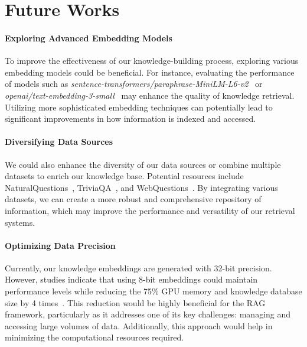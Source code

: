 \section{Future Works}

\paragraph{Exploring Advanced Embedding Models} To improve the effectiveness of our knowledge-building process, exploring various embedding models could be beneficial. For instance, evaluating the performance of models such as \emph{sentence-transformers/paraphrase-MiniLM-L6-v2}~\citep{reimers-2019-sentence-bert} or \emph{openai/text-embedding-3-small}~\citep{openaiembeddings} may enhance the quality of knowledge retrieval. Utilizing more sophisticated embedding techniques can potentially lead to significant improvements in how information is indexed and accessed.

\paragraph{Diversifying Data Sources} We could also enhance the diversity of our data sources or combine multiple datasets to enrich our knowledge base. Potential resources include NaturalQuestions~\citep[NQ,][]{NaturalQuestions}, TriviaQA~\citep[TQA,][]{TriviaQA}, and WebQuestions~\citep{WebQuestions}. By integrating various datasets, we can create a more robust and comprehensive repository of information, which may improve the performance and versatility of our retrieval systems.

\paragraph{Optimizing Data Precision} Currently, our knowledge embeddings are generated with 32-bit precision. However, studies indicate that using 8-bit embeddings could maintain performance levels while reducing the 75\% GPU memory and knowledge database size by 4 times~\citep{dettmers2023spqr, dettmers2023qlora, dettmers2022llm, DBLP:journals/corr/abs-2110-02861}. This reduction would be highly beneficial for the RAG framework, particularly as it addresses one of its key challenges: managing and accessing large volumes of data. Additionally, this approach would help in minimizing the computational resources required.

